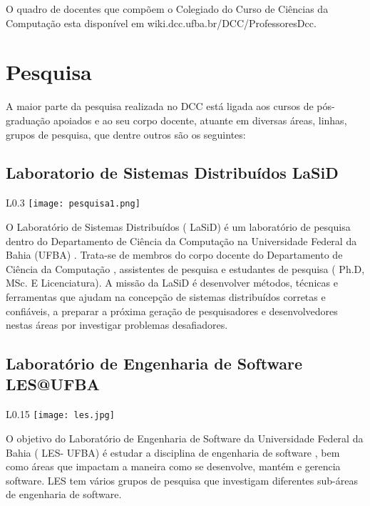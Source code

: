     O quadro de docentes que compõem o  Colegiado do Curso de Ciências da Computação esta disponível em wiki.dcc.ufba.br/DCC/ProfessoresDcc.
   
    
 
    \section{Pesquisa}
   
    A maior parte da pesquisa realizada no DCC está ligada aos cursos de pós-graduação apoiados e ao 
    seu corpo docente, atuante em diversas áreas, linhas, grupos de pesquisa, que dentre outros são os seguintes:\newline
    
    \subsection{Laboratorio de Sistemas Distribuídos LaSiD}
     \begin{wrapfigure}{L}{0.3\textwidth}
            \centering
            \texttt{[image: pesquisa1.png]}
        \end{wrapfigure}        
    O Laboratório de Sistemas Distribuídos ( LaSiD) é um laboratório de pesquisa dentro do Departamento de Ciência da Computação na Universidade Federal da Bahia (UFBA) . Trata-se de membros do corpo docente do Departamento de Ciência da Computação , assistentes de pesquisa e estudantes de pesquisa ( Ph.D, MSc. E Licenciatura). A missão da LaSiD é desenvolver métodos, técnicas e ferramentas que ajudam na concepção de sistemas distribuídos corretas e confiáveis, a preparar a próxima geração de pesquisadores e desenvolvedores nestas áreas por investigar problemas desafiadores.
   
    \subsection{Laboratório de Engenharia de Software LES@UFBA}
    \begin{wrapfigure}{L}{0.15\textwidth}
            \centering
            \texttt{[image: les.jpg]}
        \end{wrapfigure} 
    O objetivo do Laboratório de Engenharia de Software da Universidade Federal da Bahia ( LES- UFBA) é estudar a disciplina de engenharia de software , bem como áreas que impactam a maneira como se desenvolve, mantém e gerencia software. LES tem vários grupos de pesquisa que investigam diferentes sub-áreas de engenharia de software.
    
